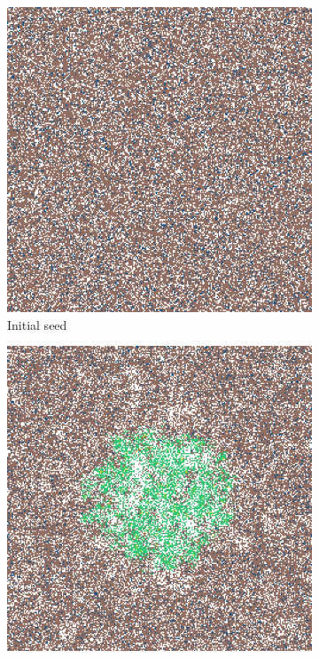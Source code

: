 \documentclass[\main/thesis.tex]{subfiles}
\begin{document}
\begin{figure}[H]
    \centering
    \begin{subfigure}[t]{.45\textwidth}
      \centering
      \includegraphics[width=\textwidth]{images/2_GeneralObservations/Fig5/1_init.jpeg}
      \caption{Initial seed}
      \label{fig:GeneralObservations_initSeed}
    \end{subfigure}
    \begin{subfigure}[t]{.45\textwidth}
      \centering
      \includegraphics[width=\textwidth]{images/2_GeneralObservations/Fig5/2_early_field_1000.jpeg}

\end{subfigure}
\end{figure}
\end{document}
